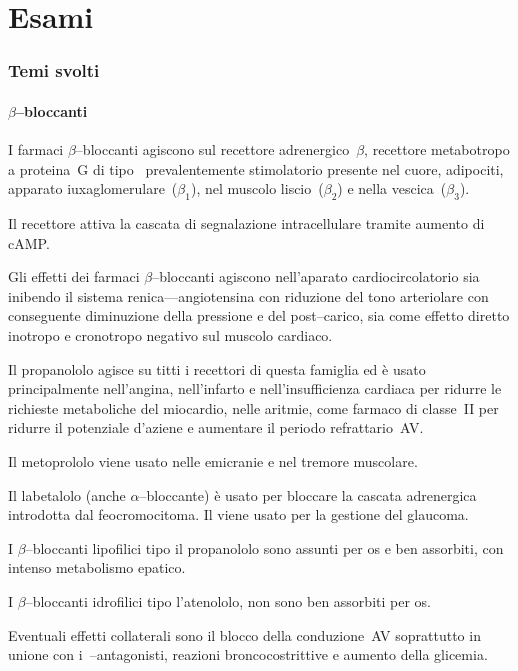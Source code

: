 \part{Esami}
\section{Temi svolti}

\subsection{$\beta$--bloccanti}

I farmaci $\beta$--bloccanti agiscono sul recettore adrenergico~$\beta$, recettore metabotropo a proteina~G di tipo~ prevalentemente stimolatorio presente nel cuore, adipociti, apparato iuxaglomerulare~($\beta_1$), nel muscolo liscio~($\beta_2$) e nella vescica~($\beta_3$).

Il recettore attiva la cascata di segnalazione intracellulare tramite aumento di cAMP.

Gli effetti dei farmaci $\beta$--bloccanti agiscono nell'aparato cardiocircolatorio sia inibendo il sistema renica---angiotensina con riduzione del tono arteriolare con conseguente diminuzione della pressione e del post--carico, sia come effetto diretto inotropo e cronotropo negativo sul muscolo cardiaco.

Il propanololo agisce su titti i recettori di questa famiglia ed è usato principalmente nell'angina, nell'infarto e nell'insufficienza cardiaca per ridurre le richieste metaboliche del miocardio, nelle aritmie, come farmaco di classe~II per ridurre il potenziale d'aziene e aumentare il periodo refrattario~AV.

Il metoprololo viene usato nelle emicranie e nel tremore muscolare.

Il labetalolo (anche $\alpha$--bloccante) è usato per bloccare la cascata adrenergica introdotta dal feocromocitoma. Il  viene usato per la gestione del glaucoma.

I $\beta$--bloccanti lipofilici tipo il propanololo sono assunti per os e ben assorbiti, con intenso metabolismo epatico.

I $\beta$--bloccanti idrofilici tipo l'atenololo, non sono ben assorbiti per os. 

Eventuali effetti collaterali sono il blocco della conduzione~AV soprattutto in unione con i~--antagonisti, reazioni broncocostrittive e aumento della glicemia.


